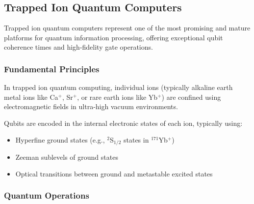 \subsection*{Trapped Ion Quantum Computers}

Trapped ion quantum computers represent one of the most promising and mature
platforms for quantum information processing, offering exceptional qubit
coherence times and high-fidelity gate operations.

\subsubsection*{Fundamental Principles}

In trapped ion quantum computing, individual ions (typically alkaline earth
metal ions like Ca$^+$, Sr$^+$, or rare earth ions like Yb$^+$) are confined
using electromagnetic fields in ultra-high vacuum environments.


\vspace{0.3cm}

\noindent
Qubits are encoded in the internal electronic states of each ion, typically
using:

\begin{itemize}
  \item Hyperfine ground states (e.g., $^2$S$_{1/2}$ states in $^{171}$Yb$^+$)
  \item Zeeman sublevels of ground states
  \item Optical transitions between ground and metastable excited states
\end{itemize}

\subsubsection*{Quantum Operations}

